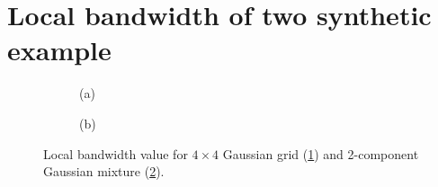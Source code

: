 \section{Local bandwidth of two synthetic example}


\captionsetup[subfigure]{labelformat=empty}
\begin{figure}[H]
    \centering 
\begin{subfigure}[b]{.48\textwidth} 
    \caption{(a)\label{fig:surf_grid}}
\end{subfigure}
\hfill
\centering
\begin{subfigure}[b]{0.48\textwidth}
    \caption{(b)\label{fig:surf_mix}}
\end{subfigure}

\caption{Local bandwidth value for $4\times 4$ Gaussian grid (\cref{fig:surf_grid}) and 2-component Gaussian mixture (\cref{fig:surf_mix}).}
\label{fig:bwsurface}
\end{figure}



